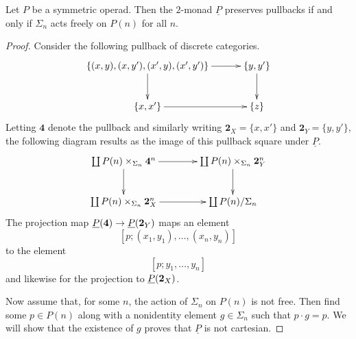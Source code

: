 \begin{prop}
Let $P$ be a symmetric operad. Then the $2$-monad $\underline{P}$ preserves pullbacks if and only if $\Sigma_{n}$ acts freely on $P(n)$ for all $n$.
\end{prop}
\begin{proof}
Consider the following pullback of discrete categories.
    \[
        \xy
            (0,0)*+{\lbrace (x,y), (x,y'), (x',y), (x',y') \rbrace}="00";
            (40,0)*+{\lbrace y,y' \rbrace}="10";
            (0,-15)*+{\lbrace x, x' \rbrace}="01";
            (40,-15)*+{\lbrace z \rbrace}="11";
            {\ar "00" ; "10"};
            {\ar "10" ; "11"};
            {\ar "00" ; "01"};
            {\ar "01" ; "11"};
        \endxy
    \]
Letting $\mathbf{4}$ denote the pullback and similarly writing $\mathbf{2}_X = \{ x, x' \}$ and $\mathbf{2}_Y = \{y, y'\}$, the following diagram results as the image of this pullback square under $\underline{P}$.
    \[
        \xy
            (0,0)*+{\coprod P(n) \times_{\Sigma_n} \mathbf{4}^n}="00";
            (40,0)*+{\coprod P(n) \times_{\Sigma_n} \mathbf{2}_Y^n}="10";
            (0,-15)*+{\coprod P(n) \times_{\Sigma_n} \mathbf{2}_X^n}="01";
            (40,-15)*+{\coprod P(n)/\Sigma_n}="11";
            {\ar "00" ; "10"};
            {\ar "10" ; "11"};
            {\ar "00" ; "01"};
            {\ar "01" ; "11"}:
        \endxy
    \]
The projection map $\underline{P}(\mathbf{4}) \rightarrow \underline{P}(\mathbf{2}_Y)$ maps an element
    \[
        [p;(x_1,y_1), \ldots, (x_n,y_n)]
    \]
to the element
    \[
        [p;y_1,\ldots,y_n]
    \]
and likewise for the projection to $\underline{P}(\mathbf{2}_X)$.

Now assume that, for some $n$, the action of $\Sigma_n$ on $P(n)$ is not free. Then find some $p \in P(n)$ along with a nonidentity element $g \in \Sigma_n$ such that $p \cdot g = p$. We will show that the existence of $g$ proves that $\underline{P}$ is not cartesian.


\end{proof}
